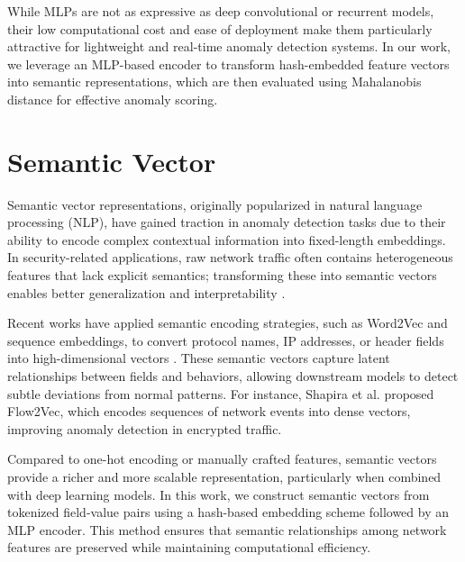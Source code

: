 \begin{ZhChapter}
    While MLPs are not as expressive as deep convolutional or recurrent models, their low computational cost and ease of deployment make them particularly attractive for lightweight and real-time anomaly detection systems. In our work, we leverage an MLP-based encoder to transform hash-embedded feature vectors into semantic representations, which are then evaluated using Mahalanobis distance for effective anomaly scoring.


    \section{Semantic Vector}
    Semantic vector representations, originally popularized in natural language processing (NLP), have gained traction in anomaly detection tasks due to their ability to encode complex contextual information into fixed-length embeddings. In security-related applications, raw network traffic often contains heterogeneous features that lack explicit semantics; transforming these into semantic vectors enables better generalization and interpretability \cite{mikolov2013distributed}.

    Recent works have applied semantic encoding strategies, such as Word2Vec and sequence embeddings, to convert protocol names, IP addresses, or header fields into high-dimensional vectors \cite{shapira2021flow,li2020embedding}. These semantic vectors capture latent relationships between fields and behaviors, allowing downstream models to detect subtle deviations from normal patterns. For instance, Shapira et al. \cite{shapira2021flow} proposed Flow2Vec, which encodes sequences of network events into dense vectors, improving anomaly detection in encrypted traffic.

    Compared to one-hot encoding or manually crafted features, semantic vectors provide a richer and more scalable representation, particularly when combined with deep learning models. In this work, we construct semantic vectors from tokenized field-value pairs using a hash-based embedding scheme followed by an MLP encoder. This method ensures that semantic relationships among network features are preserved while maintaining computational efficiency.



\end{ZhChapter}